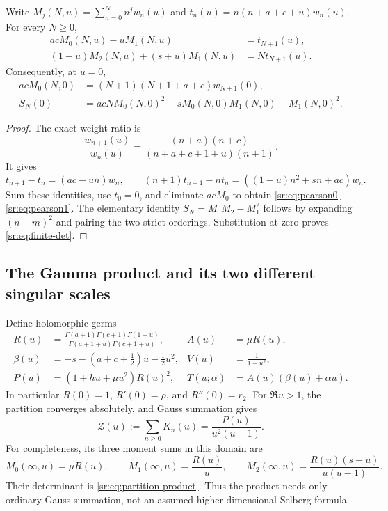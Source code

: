 \begin{proposition}\label{sr:prop:pearson}
Write $M_j(N,u)=\sum_{n=0}^N n^jw_n(u)$ and
$t_n(u)=n(n+a+c+u)w_n(u)$. For every $N\ge0$,
\begin{align}
 acM_0(N,u)-uM_1(N,u)&=t_{N+1}(u),\label{sr:eq:pearson0}\\
 (1-u)M_2(N,u)+(s+u)M_1(N,u)&=Nt_{N+1}(u).
 \label{sr:eq:pearson1}
\end{align}
Consequently, at $u=0$,
\begin{align}
 acM_0(N,0)&=(N+1)(N+1+a+c)w_{N+1}(0),\label{sr:eq:M0exact}\\
 S_N(0)&=acN M_0(N,0)^2-sM_0(N,0)M_1(N,0)-M_1(N,0)^2.
 \label{sr:eq:finite-det}
\end{align}
\end{proposition}
\begin{proof}
The exact weight ratio is
\[
 \frac{w_{n+1}(u)}{w_n(u)}
 =\frac{(n+a)(n+c)}{(n+a+c+1+u)(n+1)}.
\]
It gives
\[
 t_{n+1}-t_n=(ac-un)w_n,
 \qquad
 (n+1)t_{n+1}-nt_n=((1-u)n^2+sn+ac)w_n.
\]
Sum these identities, use $t_0=0$, and eliminate $acM_0$ to obtain
\eqref{sr:eq:pearson0}--\eqref{sr:eq:pearson1}. The elementary identity
$S_N=M_0M_2-M_1^2$ follows by expanding $(n-m)^2$ and pairing the two
strict orderings. Substitution at zero proves \eqref{sr:eq:finite-det}.
\end{proof}

\subsection{The Gamma product and its two different singular scales}
Define holomorphic germs
\begin{align}
 R(u)&=\frac{\Gamma(a+1)\Gamma(c+1)\Gamma(1+u)}
 {\Gamma(a+1+u)\Gamma(c+1+u)},& A(u)&=\mu R(u),\label{sr:eq:R}\\
 \beta(u)&=-s-(a+c+\tfrac12)u-\tfrac12u^2,
 &V(u)&=\frac1{1-u^2},\label{sr:eq:beta}\\
 P(u)&=(1+hu+\mu u^2)R(u)^2,
 &T(u;\alpha)&=A(u)(\beta(u)+\alpha u).
 \label{sr:eq:PT}
\end{align}
In particular $R(0)=1$, $R'(0)=\rho$, and $R''(0)=r_2$.
For $\Re u>1$, the partition converges absolutely, and Gauss summation
\cite[15.4.20]{dlmfgauss} gives
\begin{equation}\label{sr:eq:partition-product}
 \mathcal Z(u):=\sum_{n\ge0}K_n(u)
 =\frac{P(u)}{u^2(u-1)}.
\end{equation}
For completeness, its three moment sums in this domain are
\[
 M_0(\infty,u)=\mu R(u),\qquad
 M_1(\infty,u)=\frac{R(u)}u,\qquad
 M_2(\infty,u)=\frac{R(u)(s+u)}{u(u-1)}.
\]
Their determinant is \eqref{sr:eq:partition-product}. Thus the product
needs only ordinary Gauss summation, not an assumed higher-dimensional
Selberg formula.

